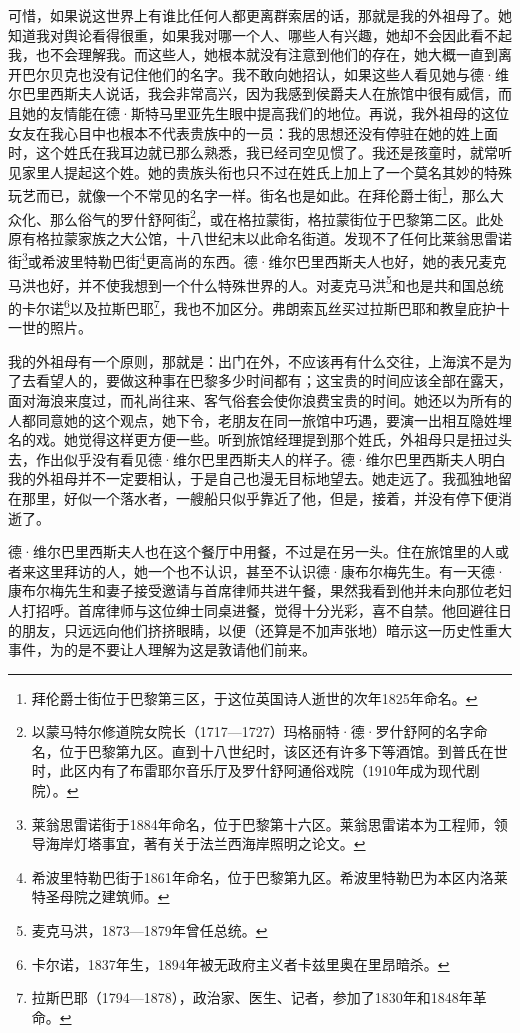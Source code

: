 \par 可惜，如果说这世界上有谁比任何人都更离群索居的话，那就是我的外祖母了。她知道我对舆论看得很重，如果我对哪一个人、哪些人有兴趣，她却不会因此看不起我，也不会理解我。而这些人，她根本就没有注意到他们的存在，她大概一直到离开巴尔贝克也没有记住他们的名字。我不敢向她招认，如果这些人看见她与德·维尔巴里西斯夫人说话，我会非常高兴，因为我感到侯爵夫人在旅馆中很有威信，而且她的友情能在德·斯特马里亚先生眼中提高我们的地位。再说，我外祖母的这位女友在我心目中也根本不代表贵族中的一员：我的思想还没有停驻在她的姓上面时，这个姓氏在我耳边就已那么熟悉，我已经司空见惯了。我还是孩童时，就常听见家里人提起这个姓。她的贵族头衔也只不过在姓氏上加上了一个莫名其妙的特殊玩艺而已，就像一个不常见的名字一样。街名也是如此。在拜伦爵士街\footnote{拜伦爵士街位于巴黎第三区，于这位英国诗人逝世的次年1825年命名。}，那么大众化、那么俗气的罗什舒阿街\footnote{以蒙马特尔修道院女院长（1717—1727）玛格丽特·德·罗什舒阿的名字命名，位于巴黎第九区。直到十八世纪时，该区还有许多下等酒馆。到普氏在世时，此区内有了布雷耶尔音乐厅及罗什舒阿通俗戏院（1910年成为现代剧院）。}，或在格拉蒙街，格拉蒙街位于巴黎第二区。此处原有格拉蒙家族之大公馆，十八世纪末以此命名街道。发现不了任何比莱翁思雷诺街\footnote{莱翁思雷诺街于1884年命名，位于巴黎第十六区。莱翁思雷诺本为工程师，领导海岸灯塔事宜，著有关于法兰西海岸照明之论文。}或希波里特勒巴街\footnote{希波里特勒巴街于1861年命名，位于巴黎第九区。希波里特勒巴为本区内洛莱特圣母院之建筑师。}更高尚的东西。德·维尔巴里西斯夫人也好，她的表兄麦克马洪也好，并不使我想到一个什么特殊世界的人。对麦克马洪\footnote{麦克马洪，1873—1879年曾任总统。}和也是共和国总统的卡尔诺\footnote{卡尔诺，1837年生，1894年被无政府主义者卡兹里奥在里昂暗杀。}以及拉斯巴耶\footnote{拉斯巴耶（1794—1878），政治家、医生、记者，参加了1830年和1848年革命。}，我也不加区分。弗朗索瓦丝买过拉斯巴耶和教皇庇护十一世的照片。
\par 我的外祖母有一个原则，那就是：出门在外，不应该再有什么交往，上海滨不是为了去看望人的，要做这种事在巴黎多少时间都有；这宝贵的时间应该全部在露天，面对海浪来度过，而礼尚往来、客气俗套会使你浪费宝贵的时间。她还以为所有的人都同意她的这个观点，她下令，老朋友在同一旅馆中巧遇，要演一出相互隐姓埋名的戏。她觉得这样更方便一些。听到旅馆经理提到那个姓氏，外祖母只是扭过头去，作出似乎没有看见德·维尔巴里西斯夫人的样子。德·维尔巴里西斯夫人明白我的外祖母并不一定要相认，于是自己也漫无目标地望去。她走远了。我孤独地留在那里，好似一个落水者，一艘船只似乎靠近了他，但是，接着，并没有停下便消逝了。
\par 德·维尔巴里西斯夫人也在这个餐厅中用餐，不过是在另一头。住在旅馆里的人或者来这里拜访的人，她一个也不认识，甚至不认识德·康布尔梅先生。有一天德·康布尔梅先生和妻子接受邀请与首席律师共进午餐，果然我看到他并未向那位老妇人打招呼。首席律师与这位绅士同桌进餐，觉得十分光彩，喜不自禁。他回避往日的朋友，只远远向他们挤挤眼睛，以便（还算是不加声张地）暗示这一历史性重大事件，为的是不要让人理解为这是敦请他们前来。
